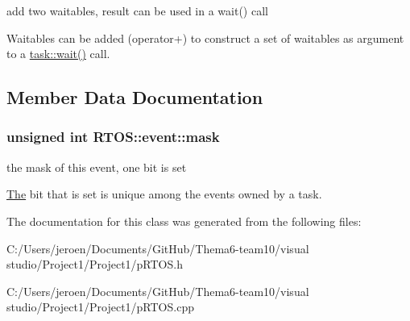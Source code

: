 add two waitables, result can be used in a wait() call 

Waitables can be added (operator+) to construct a \textquotesingle{}set of waitables\textquotesingle{} as argument to a \hyperlink{class_r_t_o_s_1_1task_a6fc603d0f1c8a94813586d3dfd123fcc}{task\+::wait()} call. 

\subsection{Member Data Documentation}
\subsubsection[{\texorpdfstring{mask}{mask}}]{\setlength{\rightskip}{0pt plus 5cm}unsigned int R\+T\+O\+S\+::event\+::mask\hspace{0.3cm}{\ttfamily [protected]}}\hypertarget{class_r_t_o_s_1_1event_a74f6161d8c82d461ae3ba29f0e222b59}{}\label{class_r_t_o_s_1_1event_a74f6161d8c82d461ae3ba29f0e222b59}


the mask of this event, one bit is set 

\hyperlink{class_the}{The} bit that is set is unique among the events owned by a task. 

The documentation for this class was generated from the following files\+:\begin{DoxyCompactItemize}
\item 
C\+:/\+Users/jeroen/\+Documents/\+Git\+Hub/\+Thema6-\/team10/visual studio/\+Project1/\+Project1/p\+R\+T\+O\+S.\+h\item 
C\+:/\+Users/jeroen/\+Documents/\+Git\+Hub/\+Thema6-\/team10/visual studio/\+Project1/\+Project1/p\+R\+T\+O\+S.\+cpp\end{DoxyCompactItemize}
